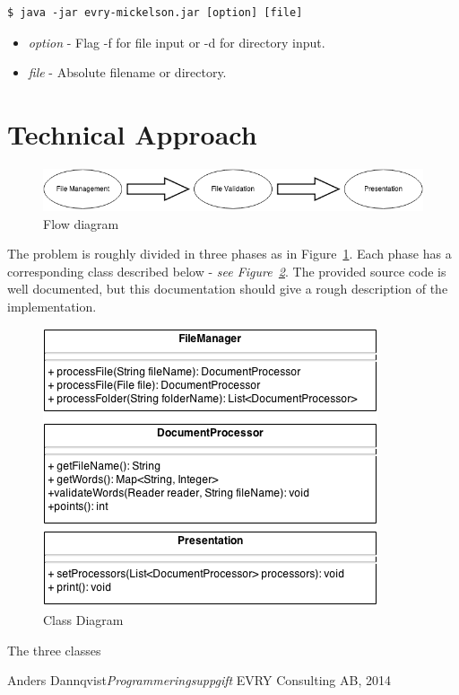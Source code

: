 \documentclass[a4paper]{article}
\begin{document}
\begin{verbatim} 
$ java -jar evry-mickelson.jar [option] [file]
\end{verbatim} 

\begin{itemize}
	\item \textit{option} - Flag -f for file input or -d for directory input.
	\item \textit{file} - Absolute filename or directory.
\end{itemize}

\section{Technical Approach}

\begin{figure}
	\includegraphics[scale=0.5]{evry-mickelson.png}
	\caption{Flow diagram}
	\label{fd}
\end{figure}

The problem is roughly divided in three phases as in Figure~\ref{fd}. Each phase has a corresponding class described below - \textit{see Figure~\ref{cd}}. The provided source code is well documented, but this documentation should give a rough description of the implementation.

\begin{figure}
	\includegraphics[scale=0.5]{cd.png}
	\caption{Class Diagram}
	\label{cd}
\end{figure}

The three classes 

\newpage

\begin{thebibliography}{99}
	Anders Dannqvist\emph{Programmeringsuppgift} EVRY Consulting AB, 2014
\end{thebibliography}
\end{document}
